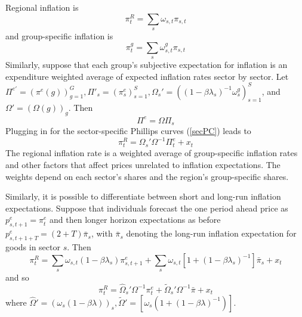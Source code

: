 \documentclass[12pt]{article}
\begin{document}
Regional inflation is 
$$\pi^R_t = \sum_{s}\omega_{s,t}\pi_{s,t}$$
and group-specific inflation is
$$ \pi^g_t = \sum_s\omega^g_{s,t}\pi_{s,t}$$
Similarly, suppose that each group's subjective expectation for inflation is an expenditure weighted average of expected inflation rates sector by sector. Let $\Pi^{e'}=\left(\pi^e(g)\right)_{g=1}^{G}, \Pi'_s=\left(\pi^e_s\right)_{s=1}^{S}, \Omega_s' = \left(\left(1-\beta\lambda_s\right)^{-1}\omega^g_s\right)_{s=1}^{S}$, and $\Omega' = \left(\Omega(g)\right)_g$. Then
\begin{equation}\label{Ident}
 \Pi^e = \Omega\Pi_s
\end{equation}
Plugging in for the sector-specific Phillips curves (\ref{secPC}) leads to
\begin{equation}\label{LOM}
\pi^R_t = \Omega_s'\Omega^{-1}\Pi^e_t + x_t
\end{equation}
The regional inflation rate is a weighted average of group-specific inflation rates and other factors that affect prices unrelated to inflation expectations. The weights depend on each sector's shares and the region's group-specific shares.

Similarly, it is possible to differentiate between short and long-run inflation expectations. Suppose that individuals forecast the one period ahead price as $p^e_{s,t+1} = \pi^e_t$ and then longer horizon expectations as before $p^e_{s,t+1+T} = (2+T)\bar{\pi}_s$, with $\bar{\pi}_s$ denoting the long-run inflation expectation for goods in sector $s$. Then
$$ \pi_t^R = \sum_s\omega_{s,t}\left( 1-\beta\lambda_s\right)\pi^e_{s,t+1}+\sum_s\omega_{s,t}\left[1+\left(1-\beta\lambda_s\right)^{-1}\right]\bar{\pi}_s + x_t$$
and so
$$ \pi_t^R = \hat{\Omega}_s'\Omega^{-1}\pi^e_t + \tilde{\Omega}_s'\Omega^{-1}\bar{\pi}+x_t$$
where $\hat{\Omega}'=\left(\omega_s(1-\beta\lambda)\right)_{s}, \tilde{\Omega}' = \left[ \omega_s\left( 1+(1-\beta\lambda )^{-1}\right)\right]$.
\end{document}
